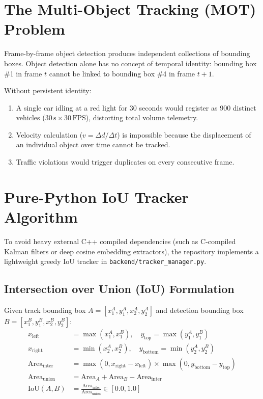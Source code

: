 \documentclass[11pt,a4paper,oneside]{report}
\begin{document}
\section{The Multi-Object Tracking (MOT) Problem}
Frame-by-frame object detection produces independent collections of bounding boxes. Object detection alone has no concept of temporal identity: bounding box \#1 in frame $t$ cannot be linked to bounding box \#4 in frame $t+1$.

Without persistent identity:
\begin{enumerate}
    \item A single car idling at a red light for 30 seconds would register as 900 distinct vehicles ($30\,\text{s} \times 30\,\text{FPS}$), distorting total volume telemetry.
    \item Velocity calculation ($v = \Delta d / \Delta t$) is impossible because the displacement of an individual object over time cannot be tracked.
    \item Traffic violations would trigger duplicates on every consecutive frame.
\end{enumerate}

\section{Pure-Python IoU Tracker Algorithm}
To avoid heavy external C++ compiled dependencies (such as C-compiled Kalman filters or deep cosine embedding extractors), the repository implements a lightweight greedy IoU tracker in \texttt{backend/tracker\_manager.py}.

\subsection{Intersection over Union (IoU) Formulation}
Given track bounding box $A = [x_1^A, y_1^A, x_2^A, y_2^A]$ and detection bounding box $B = [x_1^B, y_1^B, x_2^B, y_2^B]$:
\begin{align}
x_{\text{left}} &= \max(x_1^A, x_1^B), \quad y_{\text{top}} = \max(y_1^A, y_1^B) \\
x_{\text{right}} &= \min(x_2^A, x_2^B), \quad y_{\text{bottom}} = \min(y_2^A, y_2^B) \\
\text{Area}_{\text{inter}} &= \max(0, x_{\text{right}} - x_{\text{left}}) \times \max(0, y_{\text{bottom}} - y_{\text{top}}) \\
\text{Area}_{\text{union}} &= \text{Area}_A + \text{Area}_B - \text{Area}_{\text{inter}} \\
\text{IoU}(A, B) &= \frac{\text{Area}_{\text{inter}}}{\text{Area}_{\text{union}}} \in [0.0, 1.0]
\end{align}
\end{document}

